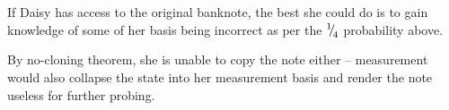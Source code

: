 \begin{parts}
\begin{subparts}
		\subpart If Daisy has access to the original banknote, the best she could do is to gain knowledge of some of her basis being incorrect as per the ${{}^{1}{\mskip -5mu/\mskip -3mu}_{4}}$ probability above.
		
		By no-cloning theorem, she is unable to copy the note either -- measurement would also collapse the state into her measurement basis and render the note useless for further probing.
	\end{subparts}
\end{parts}
